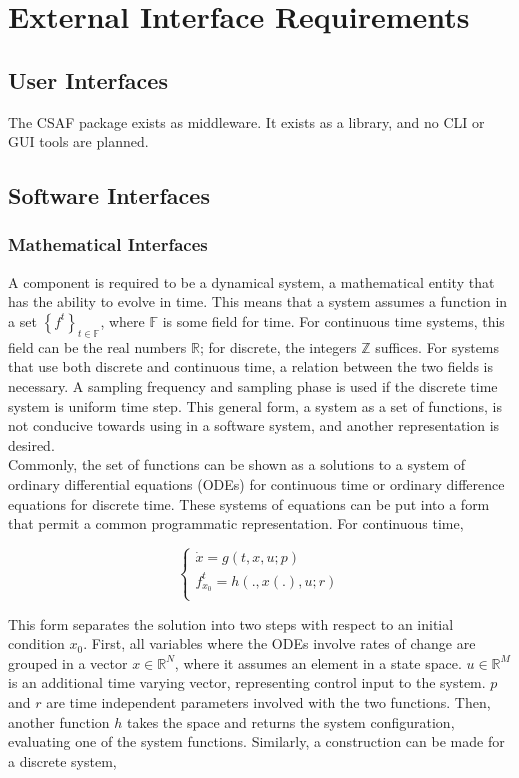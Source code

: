 \chapter{External Interface Requirements}

\section{User Interfaces}

The CSAF package exists as middleware. It exists as a library, and no CLI or GUI tools are planned.

\section{Software Interfaces}

\subsection{Mathematical Interfaces}
A component is required to be a dynamical system, a mathematical entity that has the ability to evolve in time. This means that a system assumes a function in a set $\left\{ f^t \right\}_{t \in \mathbb F}$, where $\mathbb F$ is some field for time. For continuous time systems, this field can be the real numbers $\mathbb R$; for discrete, the integers $\mathbb Z$ suffices. For systems that use both discrete and continuous time, a relation between the two fields is necessary. A sampling frequency and sampling phase is used if the discrete time system is uniform time step. This general form, a system as a set of functions, is not conducive towards using in a software system, and another representation is desired. \\

Commonly, the set of functions can be shown as a solutions to a system of ordinary differential equations (ODEs) for continuous time or ordinary difference equations for discrete time. These systems of equations can be put into a form that permit a common programmatic representation. For continuous time,

\begin{equation}
\begin{cases}
\dot x = g(t, x, u; p) \\
f_{x_0}^t = h(., x(.), u; r) \\
\end{cases}
\end{equation}

This form separates the solution into two steps with respect to an initial condition $x_0$. First, all variables where the ODEs involve rates of change are grouped in a vector $x \in \mathbb R^N$, where it assumes an element in a state space. $u \in \mathbb R^M$ is an additional time varying vector, representing control input to the system. $p$ and $r$ are time independent parameters involved with the two functions. Then, another function $h$ takes the space and returns the system configuration, evaluating one of the system functions. Similarly, a construction can be made for a discrete system,

